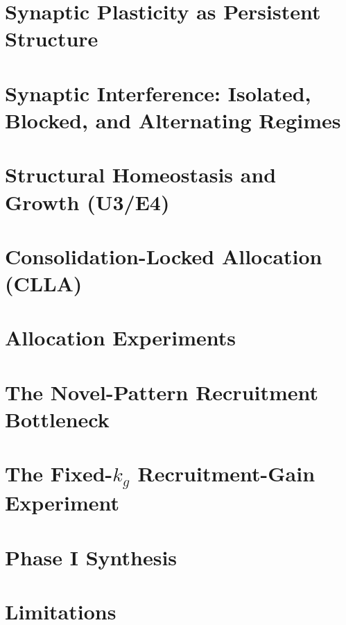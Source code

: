 \documentclass[11pt]{article}
\begin{document}
\section{Synaptic Plasticity as Persistent Structure}\label{sec:synaptic}


\section{Synaptic Interference: Isolated, Blocked, and Alternating Regimes}\label{sec:interference}


\section{Structural Homeostasis and Growth (U3/E4)}\label{sec:growth}


\section{Consolidation-Locked Allocation (CLLA)}\label{sec:clla}


\section{Allocation Experiments}\label{sec:allocation}


\section{The Novel-Pattern Recruitment Bottleneck}\label{sec:recruitment}


\section{The Fixed-\(k_g\) Recruitment-Gain Experiment}\label{sec:rg}


\section{Phase I Synthesis}\label{sec:synthesis}


\section{Limitations}\label{sec:limitations}

\end{document}

